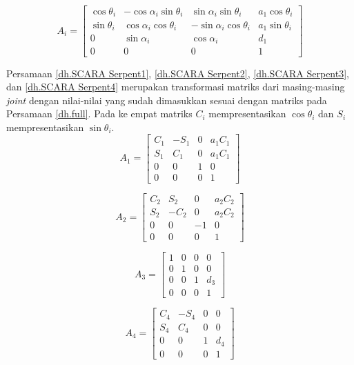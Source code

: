 \begin{equation}
A_{i} = \begin{bmatrix}
\cos\theta_{i} &  -\cos\alpha_{i}\sin\theta_{i}&  \sin\alpha_{i}\sin\theta_{i}& a_{1}\cos\theta_{i}\\ 
\sin\theta_{i}&  \cos\alpha_{i}\cos\theta_{i}&  -\sin\alpha_{i}\cos\theta_{i}& a_{1}\sin\theta_{i}\\ 
0&\sin\alpha_{i}  &\cos\alpha_{i}  &d_{1} \\ 
0 & 0 & 0 &1 
\end{bmatrix}
\label{dh.full}
\end{equation}

Persamaan \ref{dh.SCARA Serpent1}, \ref{dh.SCARA Serpent2}, \ref{dh.SCARA Serpent3}, dan \ref{dh.SCARA Serpent4} merupakan transformasi matriks dari masing-masing \textit{joint} dengan nilai-nilai yang sudah dimasukkan sesuai dengan matriks pada Persamaan \ref{dh.full}. Pada ke empat matriks $C_{i}$ mempresentasikan $\cos\theta_{i}$ dan $S_{i}$ mempresentasikan $\sin\theta_{i}$.
\begin{equation}
A_{1} = \begin{bmatrix}
C_{1} &  -S_{1}&  0& a_{1}C_{1}\\ 
S_{1}&  C_{1}&  0& a_{1}C_{1}\\ 
0&0  &1  &0 \\ 
0 & 0 & 0 &1 
\end{bmatrix}
\label{dh.SCARA Serpent1}
\end{equation}

\begin{equation}
A_{2} = \begin{bmatrix}
C_{2} &  S_{2}&  0& a_{2}C_{2}\\ 
S_{2}&  -C_{2}&  0& a_{2}C_{2}\\ 
0&0  &-1  &0 \\ 
0 & 0 & 0 &1 
\end{bmatrix}
\label{dh.SCARA Serpent2}
\end{equation}


\begin{equation}A_{3}=\begin{bmatrix}
1 & 0 &0  &0 \\ 
0&1  &0  &0 \\ 
0 &0  &1  &d_{3} \\ 
0&0  &0  &1 
\end{bmatrix} 
\label{dh.SCARA Serpent3}
\end{equation}

\begin{equation}
A_{4} = \begin{bmatrix}
C_{4} &  -S_{4}&  0& 0\\ 
S_{4}&  C_{4}&  0& 0\\ 
0&0  &1  &d_{4} \\ 
0 & 0 & 0 &1 
\end{bmatrix}
\label{dh.SCARA Serpent4}
\end{equation}

